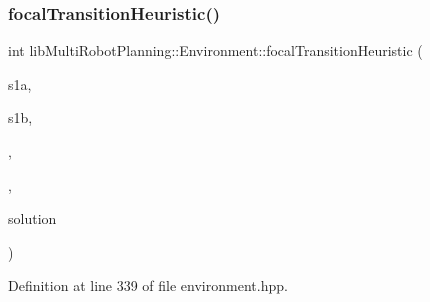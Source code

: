 \subsubsection{\texorpdfstring{focal\+Transition\+Heuristic()}{focalTransitionHeuristic()}}
{\footnotesize\ttfamily int lib\+Multi\+Robot\+Planning\+::\+Environment\+::focal\+Transition\+Heuristic (\begin{DoxyParamCaption}\item[{const \hyperlink{structlib_multi_robot_planning_1_1_state}{State} \&}]{s1a,  }\item[{const \hyperlink{structlib_multi_robot_planning_1_1_state}{State} \&}]{s1b,  }\item[{int}]{,  }\item[{int}]{,  }\item[{const std\+::vector$<$ \hyperlink{structlib_multi_robot_planning_1_1_plan_result}{Plan\+Result}$<$ \hyperlink{structlib_multi_robot_planning_1_1_state}{State}, \hyperlink{namespacelib_multi_robot_planning_aba73fb71693f86a324adfa0e41e1053d}{Action}, int $>$ $>$ \&}]{solution }\end{DoxyParamCaption})\hspace{0.3cm}{\ttfamily [inline]}}



Definition at line 339 of file environment.\+hpp.

